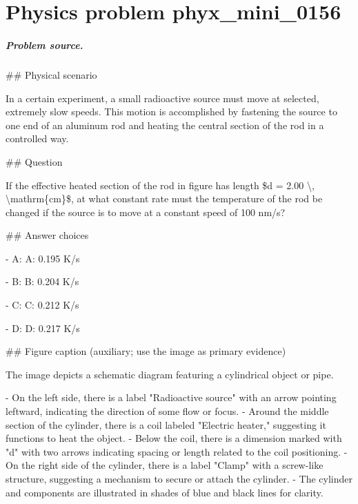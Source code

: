 
\chapter{Physics problem phyx\_mini\_0156}
\label{ch:PhyXMiniProblems_problem_phyx_mini_0156}

\paragraph{Problem source.}
\#\# Physical scenario

In a certain experiment, a small radioactive source must move at selected, extremely slow speeds. This motion is accomplished by fastening the source to one end of an aluminum rod and heating the central section of the rod in a controlled way.

\#\# Question

If the effective heated section of the rod in figure has length \$d = 2.00 \textbackslash{}, \textbackslash{}mathrm\{cm\}\$, at what constant rate must the temperature of the rod be changed if the source is to move at a constant speed of 100 nm/s?

\#\# Answer choices

- A: A: 0.195 K/s

- B: B: 0.204 K/s

- C: C: 0.212 K/s

- D: D: 0.217 K/s

\#\# Figure caption (auxiliary; use the image as primary evidence)

The image depicts a schematic diagram featuring a cylindrical object or pipe. 

- On the left side, there is a label "Radioactive source" with an arrow pointing leftward, indicating the direction of some flow or focus.
- Around the middle section of the cylinder, there is a coil labeled "Electric heater," suggesting it functions to heat the object.
- Below the coil, there is a dimension marked with "d" with two arrows indicating spacing or length related to the coil positioning.
- On the right side of the cylinder, there is a label "Clamp" with a screw-like structure, suggesting a mechanism to secure or attach the cylinder.
- The cylinder and components are illustrated in shades of blue and black lines for clarity.

